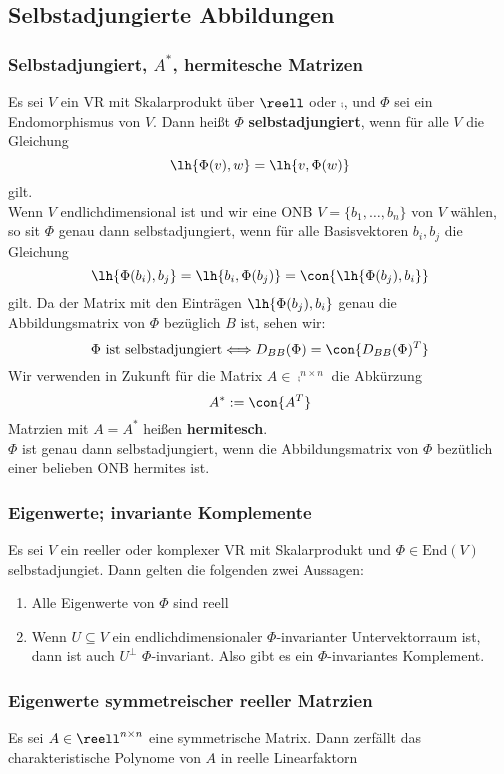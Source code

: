 \documentclass{kit}
\begin{document}
  \subsection{Selbstadjungierte Abbildungen}
    \subsubsection{Selbstadjungiert, \texorpdfstring{$A^*$}{}, hermitesche Matrizen}
      Es sei $V$ ein VR mit Skalarprodukt über $\reell$ oder $\comp$, und $\Phi$ sei ein Endomorphismus von $V$. Dann heißt
      $\Phi$ \textbf{selbstadjungiert}, wenn für alle $V$ die Gleichung
      $$\lh{\Phi(v),w}=\lh{v,\Phi(w)}$$
      gilt.\\
      Wenn $V$ endlichdimensional ist und wir eine ONB $V=\{b_1,\dots,b_n\}$ von $V$ wählen, so sit $\Phi$ genau dann
      selbstadjungiert, wenn für alle Basisvektoren $b_i,b_j$ die Gleichung
      $$\lh{\Phi(b_i),b_j}=\lh{b_i,\Phi(b_j)}=\con{\lh{\Phi(b_j),b_i}}$$
      gilt. Da der Matrix mit den Einträgen $\lh{\Phi(b_j),b_i}$ genau die Abbildungsmatrix von $\Phi$ bezüglich $B$ ist,
      sehen wir:
      $$\Phi\text{ ist selbstadjungiert}\Longleftrightarrow D_{BB}(\Phi)=\con{D_{BB}(\Phi)^T}$$
      Wir verwenden in Zukunft für die Matrix $A\in\comp^{n\times n}$ die Abkürzung
      $$A^*:=\con{A^T}$$
      Matrzien mit $A=A^*$ heißen \textbf{hermitesch}.\\
      $\Phi$ ist genau dann selbstadjungiert, wenn die Abbildungsmatrix von $\Phi$ bezütlich einer belieben ONB hermites 
      ist.
    \subsubsection{Eigenwerte; invariante Komplemente}
      Es sei $V$ ein reeller oder komplexer VR mit Skalarprodukt und $\Phi\in\text{End}(V)$ selbstadjungiet. Dann gelten
      die folgenden zwei Aussagen:
      \begin{enumerate}
      \item Alle Eigenwerte von $\Phi$ sind reell
      \item Wenn $U\subseteq V$ ein endlichdimensionaler $\Phi$-invarianter Untervektorraum ist, dann ist auch $U^\perp$
        $\Phi$-invariant. Also gibt es ein $\Phi$-invariantes Komplement.
      \end{enumerate}
    \subsubsection{Eigenwerte symmetreischer reeller Matrzien}
      Es sei $A\in\reell^{n\times n}$ eine symmetrische Matrix. Dann zerfällt das charakteristische Polynome von $A$ in
      reelle Linearfaktorn
\end{document}
